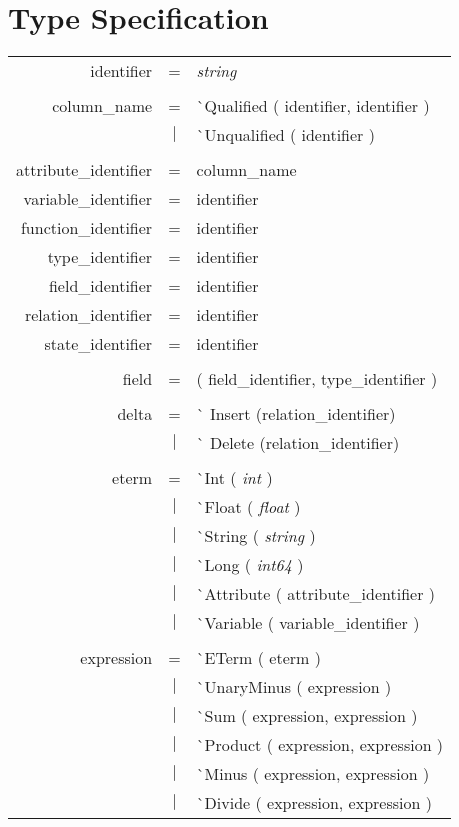 \documentclass{article}
\begin{document}
\section{Type Specification}
\begin{tabular}[ht] {rcl}
identifier & = & \emph{string}\\
\\
column\_name &=& \`{}Qualified ( identifier, identifier )\\
&$\lvert$ & \`{}Unqualified ( identifier ) \\
\\
attribute\_identifier &=& column\_name\\
variable\_identifier &=& identifier\\
function\_identifier &=& identifier\\
type\_identifier &=& identifier\\
field\_identifier &=& identifier\\
relation\_identifier &=& identifier\\
state\_identifier &=& identifier\\
\\
field &=& ( field\_identifier, type\_identifier ) \\
\\
delta &=& \`{} Insert (relation\_identifier) \\
& $\lvert$ &  \`{} Delete (relation\_identifier) \\
\\
eterm &=& \`{}Int ( \emph{int} )\\
&$\lvert$ & \`{}Float ( \emph{float} )\\
&$\lvert$ & \`{}String ( \emph{string} )\\
&$\lvert$ & \`{}Long ( \emph{int64} )\\
&$\lvert$ & \`{}Attribute ( attribute\_identifier )\\
&$\lvert$ & \`{}Variable ( variable\_identifier )\\
\\
expression & =& \`{}ETerm ( eterm )\\
&$\lvert$ & \`{}UnaryMinus ( expression )\\
&$\lvert$ & \`{}Sum ( expression, expression )\\
&$\lvert$ & \`{}Product ( expression, expression )\\
&$\lvert$ & \`{}Minus ( expression, expression )\\
&$\lvert$ & \`{}Divide ( expression, expression ) \\

\end{tabular}
\end{document}
